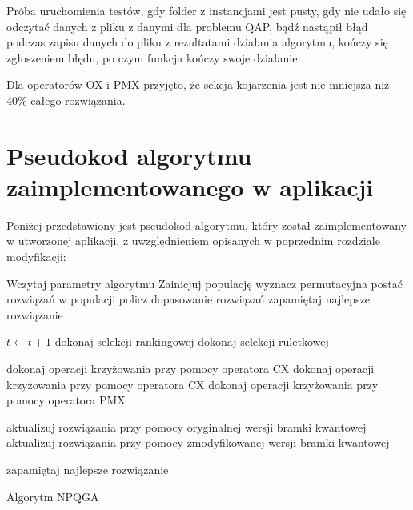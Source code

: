 Próba uruchomienia testów, gdy folder z instancjami jest pusty, gdy nie udało się odczytać danych z pliku z danymi dla problemu QAP, bądź nastąpił błąd podczas zapisu danych do pliku z rezultatami działania algorytmu, kończy się zgłoszeniem błędu, po czym funkcja kończy swoje działanie.

Dla operatorów OX i PMX przyjęto, że sekcja kojarzenia jest nie mniejsza niż 40\% całego rozwiązania.

\section{Pseudokod algorytmu zaimplementowanego w aplikacji}
Poniżej przedstawiony jest pseudokod algorytmu, który został zaimplementowany w utworzonej aplikacji, z uwzględnieniem opisanych w poprzednim rozdziale modyfikacji:

\newpage
\begin{algorithm}[H]
	Wczytaj parametry algorytmu\;	
	Zainicjuj populację\;
	wyznacz permutacyjna postać rozwiązań w populacji\;
	policz dopasowanie rozwiązań\;
	zapamiętaj najlepsze rozwiązanie\;
 	{ 
 		$t\leftarrow t+1$\;
		{
			dokonaj selekcji rankingowej\;
		}
		\Else
		{
			dokonaj selekcji ruletkowej\;
		}
		
		{
			dokonaj operacji krzyżowania przy pomocy operatora CX\;
		}
		{
			dokonaj operacji krzyżowania przy pomocy operatora CX\;
		}
		\Else
		{
			dokonaj operacji krzyżowania przy pomocy operatora PMX\;
		}
		
		{
			aktualizuj rozwiązania przy pomocy oryginalnej wersji bramki kwantowej\;
		}
		{
			aktualizuj rozwiązania przy pomocy zmodyfikowanej wersji bramki kwantowej\;
		}
		
		zapamiętaj najlepsze rozwiązanie\;
 	}
 	\caption{Algorytm NPQGA}
\end{algorithm}